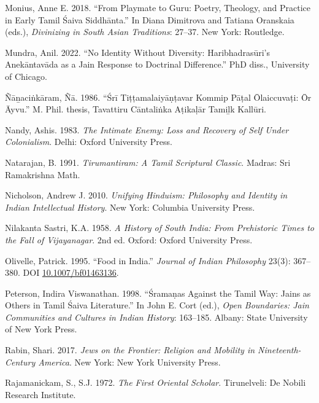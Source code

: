 \begin{hangparas}{0.125in}{1}
	\label{Monius2018}Monius, Anne E. 2018. “From Playmate to Guru: Poetry, Theology, and Practice in Early Tamil Śaiva Siddhānta.” In Diana Dimitrova and Tatiana Oranskaia (eds.), \emph{Divinizing in South Asian Traditions}: 27–37. New York: Routledge.\medskip


	\label{Mundra2022}Mundra, Anil. 2022. “No Identity Without Diversity: Haribhadrasūri’s Anekāntavāda as a Jain Response to Doctrinal Difference.” PhD diss., University of Chicago.\medskip


	\label{Nanacinkaram1986}Ñāṉaciṅkāram, Ñā. 1986. “Śrī Tiṭṭamalaiyāṇṭavar Kommip Pāṭal Ōlaiccuvaṭi: Ōr Āyvu.” M. Phil. thesis, Tavattiru Cāntaliṅka Aṭikaḷār Tamiḻk Kallūri. \medskip


	\label{Nandy1983}Nandy, Ashis. 1983. \emph{The Intimate Enemy: Loss and Recovery of Self Under Colonialism}. Delhi: Oxford University Press.\medskip


	\label{Natarajan1991}Natarajan, B. 1991. \emph{Tirumantiram: A Tamil Scriptural Classic}. Madras: Sri Ramakrishna Math.\medskip


	\label{Nicholson2010}Nicholson, Andrew J. 2010. \emph{Unifying Hinduism: Philosophy and Identity in Indian Intellectual History}. New York: Columbia University Press.\medskip


	\label{NilakantaSastri1958}Nilakanta Sastri, K.\thinskip{}A. 1958. \emph{A History of South India: From Prehistoric Times to the Fall of Vijayanagar}. 2nd ed. Oxford: Oxford University Press.\medskip


	\label{Olivelle1995}Olivelle, Patrick. 1995. “Food in India.” \emph{Journal of Indian Philosophy} 23(3): 367–380. DOI \href{https://doi.org/10.1007/bf01463136}{10.1007/bf01463136}.\medskip


	\label{Peterson1998}Peterson, Indira Viswanathan. 1998. “Śramaṇas Against the Tamil Way: Jains as Others in Tamil Śaiva Literature.” In John E. Cort (ed.), \emph{Open Boundaries: Jain Communities and Cultures in Indian History}: 163–185. Albany: State University of New York Press.\medskip


	\label{Rabin2017}Rabin, Shari. 2017. \emph{Jews on the Frontier: Religion and Mobility in Nineteenth-Century America}. New York: New York University Press.\medskip


	\label{Rajamanickam1972}Rajamanickam, S., S.\thinskip{}J. 1972. \emph{The First Oriental Scholar}. Tirunelveli: De Nobili Research Institute.\medskip



\end{hangparas}
